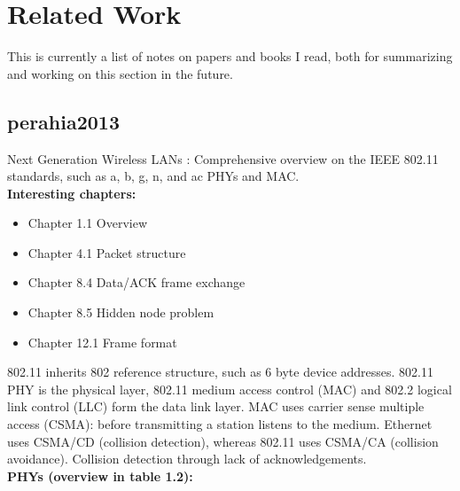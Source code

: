 
\chapter{Related Work}\label{ch:relatedwork}

\glsresetall %


This is currently a list of notes on papers and books I read, both for summarizing and working on this section in the future.



\section{perahia2013}

Next Generation Wireless LANs \cite{perahia2013}: Comprehensive overview on the IEEE 802.11 standards, such as a, b, g, n, and ac PHYs and MAC.\\

\textbf{Interesting chapters:}

\begin{itemize}
	\item Chapter 1.1 Overview
	\item Chapter 4.1 Packet structure
	\item Chapter 8.4 Data/ACK frame exchange
	\item Chapter 8.5 Hidden node problem
	\item Chapter 12.1 Frame format
\end{itemize}

802.11 inherits 802 reference structure, such as 6 byte device addresses. 802.11 PHY is the physical layer, 802.11 medium access control (MAC) and 802.2 logical link control (LLC) form the data link layer. MAC uses carrier sense multiple access (CSMA): before transmitting a station listens to the medium. Ethernet uses CSMA/CD (collision detection), whereas 802.11 uses CSMA/CA (collision avoidance). Collision detection through lack of acknowledgements.\\

\textbf{PHYs (overview in \cite{perahia2013} table 1.2):}

